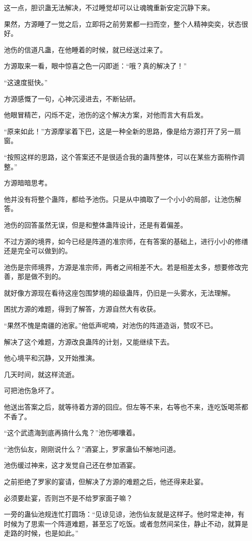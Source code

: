 \begin{this_body}
这一点，胆识蛊无法解决，不过睡觉却可以让魂魄重新安定沉静下来。

果然，方源睡了一觉之后，立即将之前劳累都一扫而空，整个人精神奕奕，状态很好。

池伤的信道凡蛊，在他睡着的时候，就已经送过来了。

方源取来一看，眼中惊喜之色一闪即逝：“哦？真的解决了！”

“这速度挺快。”

方源感慨了一句，心神沉浸进去，不断钻研。

他眼冒精芒，闪烁不定，池伤的这个解决方案，对他而言大有启发。

“原来如此！”方源摩挲着下巴，这是一种全新的思路，像是给方源打开了另一扇窗。

“按照这样的思路，这个答案还不是很适合我的蛊阵整体，可以在某些方面稍作调整。”

方源暗暗思考。

他并没有将整个蛊阵，都给予池伤。只是从中摘取了一个小小的局部，让池伤解答。

池伤的回答虽然无误，但是和整体蛊阵设计，还是有着偏差。

不过方源的境界，如今已经是阵道的准宗师，在有答案的基础上，进行小小的修缮还是完全可以做到的。

池伤是宗师境界，方源是准宗师，两者之间相差不大。若是相差太多，想要修改完善，那是做不到的。

就好像方源现在看待这座包围梦境的超级蛊阵，仍旧是一头雾水，无法理解。

困扰方源的难题，得到了解答，方源自然大有收获。

“果然不愧是南疆的池家。”他低声呢喃，对池伤的阵道造诣，赞叹不已。

解决了这个难题，方源改良蛊阵的计划，又能继续下去。

他心境平和沉静，又开始推演。

几天时间，就这样流逝。

可把池伤急坏了。

他送出答案之后，就等待着方源的回应。但左等不来，右等也不来，连吃饭喝茶都不香了。

“这个武遗海到底再搞什么鬼？”池伤嘟囔着。

“池伤仙友，刚刚说什么？”酒宴上，罗家蛊仙不解地问道。

池伤缓过神来，这才发觉自己还在参加酒宴。

之前拒绝了罗家的宴请，但解决了方源的难题之后，他还得来赴宴。

必须要赴宴，否则岂不是不给罗家面子嘛？

一旁的蛊仙池规连忙打圆场：“见谅见谅，池伤仙友就是这样子。他时常走神，有时候为了思索一个阵道难题，甚至忘了吃饭。或者忽然间呆住，静止不动，就算是走路的时候，也是如此。”


\end{this_body}
